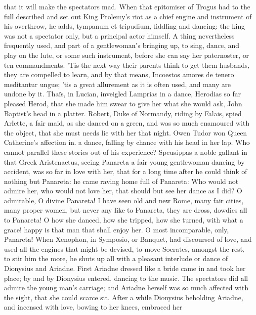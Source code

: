 {that it will make the spectators mad. When that epitomiser of
Trogus had to the full described and set out King Ptolemy's riot
as a chief engine and instrument of his overthrow, he adds, tympanum et
tripudium, fiddling and dancing: the king was not a spectator only, but
a principal actor himself. A thing nevertheless frequently used, and
part of a gentlewoman's bringing up, to sing, dance, and play on the
lute, or some such instrument, before she can say her paternoster, or
ten commandments. 'Tis the next way their parents think to get them
husbands, they are compelled to learn, and by that means,
Incoestos amores de tenero meditantur ungue; 'tis a great
allurement as it is often used, and many are undone by it. Thaïs, in
Lucian, inveigled Lamprias in a dance, Herodias so far pleased Herod,
that she made him swear to give her what she would ask, John Baptist's
head in a platter. Robert, Duke of Normandy, riding by Falais,
spied Arlette, a fair maid, as she danced on a green, and was so much
enamoured with the object, that she must needs lie with her that
night. Owen Tudor won Queen Catherine's affection in. a dance, falling
by chance with his head in her lap. Who cannot parallel these stories
out of his experience? Speusippas a noble gallant in that Greek
Aristenaetus, seeing Panareta a fair young gentlewoman dancing by
accident, was so far in love with her, that for a long time after he
could think of nothing but Panareta: he came raving home full of
Panareta: Who would not admire her, who would not love her, that should
but see her dance as I did? O admirable, O divine Panareta! I have seen
old and new Rome, many fair cities, many proper women, but never any
like to Panareta, they are dross, dowdies all to Panareta! O how she
danced, how she tripped, how she turned, with what a grace! happy is
that man that shall enjoy her. O most incomparable, only, Panareta!
When Xenophon, in Symposio, or Banquet, had discoursed of love, and
used all the engines that might be devised, to move Socrates, amongst
the rest, to stir him the more, he shuts up all with a pleasant
interlude or dance of Dionysius and Ariadne. First Ariadne
dressed like a bride came in and took her place; by and by Dionysius
entered, dancing to the music. The spectators did all admire the young
man's carriage; and Ariadne herself was so much affected with the
sight, that she could scarce sit. After a while Dionysius beholding
Ariadne, and incensed with love, bowing to her knees, embraced her
}
